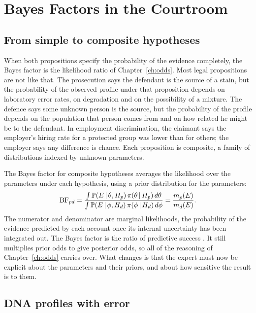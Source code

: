 \chapter{Bayes Factors in the Courtroom}
\label{ch:bf}

\section{From simple to composite hypotheses}

When both propositions specify the probability of the evidence completely, the Bayes factor is the likelihood ratio of Chapter~\ref{ch:odds}. Most legal propositions are not like that. The prosecution says the defendant is the source of a stain, but the probability of the observed profile under that proposition depends on laboratory error rates, on degradation and on the possibility of a mixture. The defence says some unknown person is the source, but the probability of the profile depends on the population that person comes from and on how related he might be to the defendant. In employment discrimination, the claimant says the employer's hiring rate for a protected group was lower than for others; the employer says any difference is chance. Each proposition is composite, a family of distributions indexed by unknown parameters.

The Bayes factor for composite hypotheses averages the likelihood over the parameters under each hypothesis, using a prior distribution for the parameters:
\begin{equation}
\mathrm{BF}_{pd} = \frac{\int \mathbb{P}(E\,\vert\, \theta, H_{p})\,\pi(\theta\,\vert\,H_{p})\,d\theta}{\int \mathbb{P}(E\,\vert\, \phi,H_{d})\,\pi(\phi\,\vert\,H_{d})\,d\phi} = \frac{m_p(E)}{m_d(E)} .
\label{eq:bfcomposite}
\end{equation}
The numerator and denominator are marginal likelihoods, the probability of the evidence predicted by each account once its internal uncertainty has been integrated out. The Bayes factor is the ratio of predictive success \citep{kass1995}. It still multiplies prior odds to give posterior odds, so all of the reasoning of Chapter~\ref{ch:odds} carries over. What changes is that the expert must now be explicit about the parameters and their priors, and about how sensitive the result is to them.

\section{DNA profiles with error}


